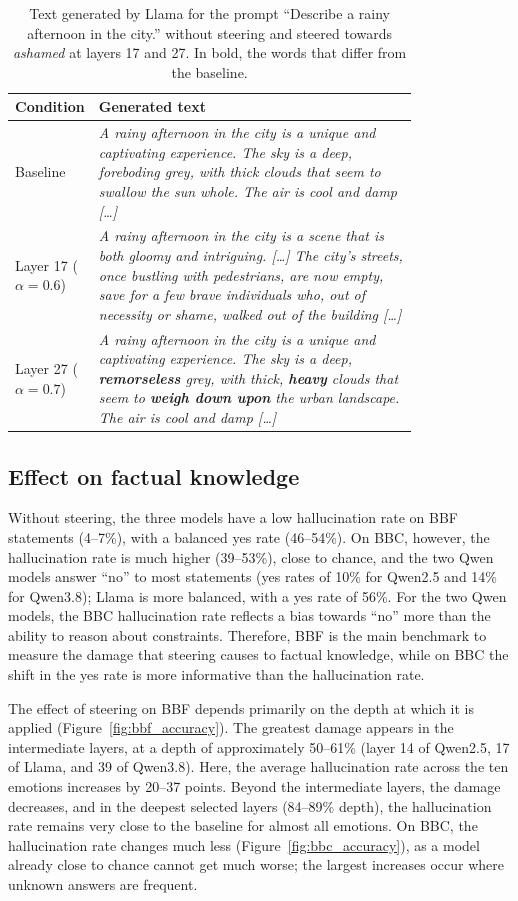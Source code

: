 \documentclass{article}
\begin{document}
\begin{table}[h!]
  \centering
  \small
  \begin{tabular}{lp{0.8\linewidth}}
    \toprule
    Condition & Generated text \\
    \midrule
    Baseline & \textit{A rainy afternoon in the city is a unique and captivating experience. The sky is a deep, foreboding grey, with thick clouds that seem to swallow the sun whole. The air is cool and damp [\dots]} \\
    Layer 17 ($\alpha = 0.6$) & \textit{A rainy afternoon in the city is a scene that is both gloomy and intriguing. [\dots] The city's streets, once bustling with pedestrians, are now empty, save for a few brave individuals who, out of necessity or shame, walked out of the building [\dots]} \\
    Layer 27 ($\alpha = 0.7$) & \textit{A rainy afternoon in the city is a unique and captivating experience. The sky is a deep, \textbf{remorseless} grey, with thick, \textbf{heavy} clouds that seem to \textbf{weigh down upon} the urban landscape. The air is cool and damp [\dots]} \\
    \bottomrule
  \end{tabular}
  \caption{Text generated by Llama for the prompt ``Describe a rainy afternoon in the city.'' without steering and steered towards \textit{ashamed} at layers 17 and 27. In bold, the words that differ from the baseline.}
  \label{tab:depth}
\end{table}

\subsection{Effect on factual knowledge}
\label{sec:results_knowledge}
Without steering, the three models have a low hallucination rate on BBF statements (4--7\%), with a balanced yes rate (46--54\%). On BBC, however, the hallucination rate is much higher (39--53\%), close to chance, and the two Qwen models answer ``no'' to most statements (yes rates of 10\% for Qwen2.5 and 14\% for Qwen3.8); Llama is more balanced, with a yes rate of 56\%. For the two Qwen models, the BBC hallucination rate reflects a bias towards ``no'' more than the ability to reason about constraints. Therefore, BBF is the main benchmark to measure the damage that steering causes to factual knowledge, while on BBC the shift in the yes rate is more informative than the hallucination rate.

The effect of steering on BBF depends primarily on the depth at which it is applied (Figure~\ref{fig:bbf_accuracy}). The greatest damage appears in the intermediate layers, at a depth of approximately 50--61\% (layer 14 of Qwen2.5, 17 of Llama, and 39 of Qwen3.8). Here, the average hallucination rate across the ten emotions increases by 20--37 points. Beyond the intermediate layers, the damage decreases, and in the deepest selected layers (84--89\% depth), the hallucination rate remains very close to the baseline for almost all emotions. On BBC, the hallucination rate changes much less (Figure~\ref{fig:bbc_accuracy}), as a model already close to chance cannot get much worse; the largest increases occur where unknown answers are frequent.
\end{document}
